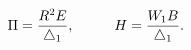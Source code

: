 \begin{equation}
\label{defmon1}
\Pi = \frac{R^2 E}{\bigtriangleup_1},
\hspace{1.0cm}
H = \frac{W_1 B}{\bigtriangleup_1}.
\end{equation}

